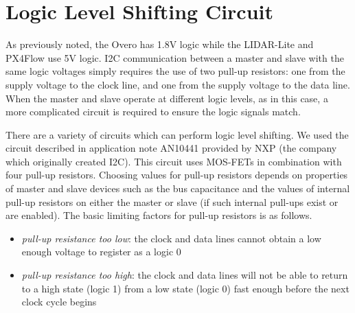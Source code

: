 \documentclass[10pt]{article}
\begin{document}
\section*{Logic Level Shifting Circuit}
As previously noted, the Overo has 1.8V logic while the LIDAR-Lite and PX4Flow use 5V logic. I2C communication between a master and slave with the same logic voltages simply requires the use of two pull-up resistors: one from the supply voltage to the clock line, and one from the supply voltage to the data line. When the master and slave operate at different logic levels, as in this case, a more complicated circuit is required to ensure the logic signals match.

There are a variety of circuits which can perform logic level shifting. We used the circuit described in application note AN10441 provided by NXP (the company which originally created I2C). This circuit uses MOS-FETs in combination with four pull-up resistors. Choosing values for pull-up resistors depends on properties of master and slave devices such as the bus capacitance and the values of internal pull-up resistors on either the master or slave (if such internal pull-ups exist or are enabled). The basic limiting factors for pull-up resistors is as follows.
\begin{itemize}
\item \textit{pull-up resistance too low}: the clock and data lines cannot obtain a low enough voltage to register as a logic 0
\item \textit{pull-up resistance too high}: the clock and data lines will not be able to return to a high state (logic 1) from a low state (logic 0) fast enough before the next clock cycle begins
\end{itemize}
\end{document}
